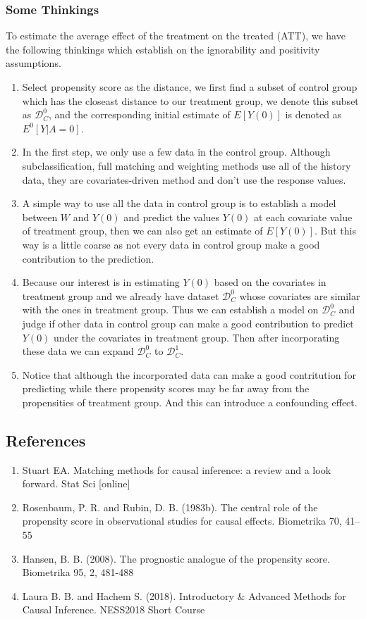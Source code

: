 \documentclass{article}
\begin{document}
\subsubsection{Some Thinkings}
To estimate the average effect of the treatment on the treated (ATT), we have the following thinkings which establish on the ignorability and positivity assumptions.

\begin{enumerate}
\item Select propensity score as the distance, we first find a subset of control group which has the closeast distance to our treatment group, we denote this subset as $\mathscr{D}^{0}_{C}$, and the corresponding initial estimate of $E[Y(0)]$ is denoted as $E^{0}[Y|A=0]$.
\item In the first step, we only use a few data in the control group. Although subclassification, full matching and weighting methods use all of the history data, they are covariates-driven method and don't use the response values.
\item A simple way to use all the data in control group is to establish a model between $W$ and $Y(0)$ and predict the values $Y(0)$ at each covariate value of treatment group, then we can also get an estimate of $E[Y(0)]$. But this way is a little coarse as not every data in control group make a good contribution to the prediction.
\item Because our interest is in estimating $Y(0)$ based on the covariates in treatment group and we already have dataset $\mathscr{D}^{0}_{C}$ whose covariates are similar with the ones in treatment group. Thus we can establish a model on $\mathscr{D}^{0}_{C}$ and judge if other data in control group can make a good contribution to predict $Y(0)$ under the covariates in treatment group. Then after incorporating these data we can expand $\mathscr{D}^{0}_{C}$ to $\mathscr{D}^{1}_{C}$.
\item Notice that although the incorporated data can make a good contritution for predicting while there propensity scores may be far away from the propensities of treatment group. And this can introduce a confounding effect. 
\end{enumerate}


\subsection{References}
\begin{enumerate}
\item Stuart EA. Matching methods for causal inference: a review
and a look forward. Stat Sci [online]
\item Rosenbaum, P. R. and Rubin, D. B. (1983b). The central role of the propensity score in observational studies for causal effects. Biometrika 70, 41–55
\item Hansen, B. B. (2008). The prognostic analogue of the propensity score. Biometrika 95, 2, 481-488
\item Laura B. B. and Hachem S. (2018). Introductory \& Advanced Methods for Causal Inference. NESS2018 Short Course
\end{enumerate}
\end{document}
